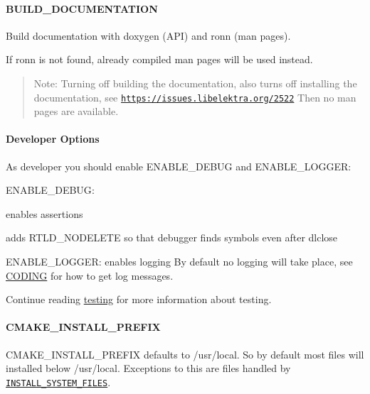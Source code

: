 \paragraph*{B\+U\+I\+L\+D\+\_\+\+D\+O\+C\+U\+M\+E\+N\+T\+A\+T\+I\+ON}

Build documentation with doxygen (A\+PI) and ronn (man pages).

If ronn is not found, already compiled man pages will be used instead.

\begin{quote}
Note\+: Turning off building the documentation, also turns off installing the documentation, see \href{https://issues.libelektra.org/2522}{\tt https\+://issues.\+libelektra.\+org/2522} Then no man pages are available. \end{quote}


\paragraph*{Developer Options}

As developer you should enable {\ttfamily E\+N\+A\+B\+L\+E\+\_\+\+D\+E\+B\+UG} and {\ttfamily E\+N\+A\+B\+L\+E\+\_\+\+L\+O\+G\+G\+ER}\+:


\begin{DoxyItemize}
\item {\ttfamily E\+N\+A\+B\+L\+E\+\_\+\+D\+E\+B\+UG}\+:
\begin{DoxyItemize}
\item enables assertions
\item adds R\+T\+L\+D\+\_\+\+N\+O\+D\+E\+L\+E\+TE so that debugger finds symbols even after dlclose
\end{DoxyItemize}
\item {\ttfamily E\+N\+A\+B\+L\+E\+\_\+\+L\+O\+G\+G\+ER}\+: enables logging By default no logging will take place, see \hyperlink{doc_CODING_md}{C\+O\+D\+I\+NG} for how to get log messages.
\end{DoxyItemize}

Continue reading \hyperlink{doc_TESTING_md}{testing} for more information about testing.

\paragraph*{{\ttfamily C\+M\+A\+K\+E\+\_\+\+I\+N\+S\+T\+A\+L\+L\+\_\+\+P\+R\+E\+F\+IX}}

{\ttfamily C\+M\+A\+K\+E\+\_\+\+I\+N\+S\+T\+A\+L\+L\+\_\+\+P\+R\+E\+F\+IX} defaults to {\ttfamily /usr/local}. So by default most files will installed below {\ttfamily /usr/local}. Exceptions to this are files handled by \href{#install_system_files}{\tt I\+N\+S\+T\+A\+L\+L\+\_\+\+S\+Y\+S\+T\+E\+M\+\_\+\+F\+I\+L\+ES}.

